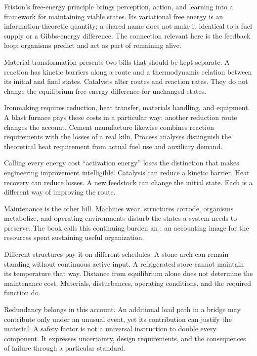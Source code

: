 Friston's free-energy principle brings perception, action, and learning into a framework for maintaining viable states.\cite{friston2010} Its variational free energy is an information-theoretic quantity; a shared name does not make it identical to a fuel supply or a Gibbs-energy difference. The connection relevant here is the feedback loop: organisms predict and act as part of remaining alive.


Material transformation presents two bills that should be kept separate. A reaction has kinetic barriers along a route and a thermodynamic relation between its initial and final states. Catalysts alter routes and reaction rates. They do not change the equilibrium free-energy difference for unchanged states.

Ironmaking requires reduction, heat transfer, materials handling, and equipment. A blast furnace pays these costs in a particular way; another reduction route changes the account.\cite{babich2021blast} Cement manufacture likewise combines reaction requirements with the losses of a real kiln. Process analyses distinguish the theoretical heat requirement from actual fuel use and auxiliary demand.\cite{madivate1999theoretical,madlool2011cement}

Calling every energy cost “activation energy” loses the distinction that makes engineering improvement intelligible. Catalysis can reduce a kinetic barrier. Heat recovery can reduce losses. A new feedstock can change the initial state. Each is a different way of improving the route.


Maintenance is the other bill. Machines wear, structures corrode, organisms metabolize, and operating environments disturb the states a system needs to preserve. The book calls this continuing burden an : an accounting image for the resources spent sustaining useful organization.

Different structures pay it on different schedules. A stone arch can remain standing without continuous active input. A refrigerated store cannot maintain its temperature that way. Distance from equilibrium alone does not determine the maintenance cost. Materials, disturbances, operating conditions, and the required function do.

Redundancy belongs in this account. An additional load path in a bridge may contribute only under an unusual event, yet its contribution can justify the material. A safety factor is not a universal instruction to double every component. It expresses uncertainty, design requirements, and the consequences of failure through a particular standard.

